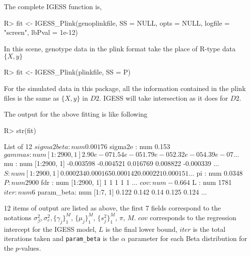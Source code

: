 \documentclass[11pt]{article}
\begin{document}
The complete IGESS function is,
\begin{Schunk}
\begin{Sinput}
R> fit <- IGESS_Plink(genoplinkfile, SS = NULL, opts = NULL, logfile = "screen",
                                                                   lbPval = 1e-12)
\end{Sinput}
\end{Schunk}

In this scene,  genotype data in the plink format take the place of R-type data $\{X, y\}$
\begin{Schunk}
\begin{Sinput}
R> fit <- IGESS_Plink(plinkfile, SS = P)
\end{Sinput}
\end{Schunk}
For the simulated data in this package, all the information contained in the plink files is the same as $\{X, y\}$ in $D2$. IGESS will take intersection as it does for $D2$.



The output for the above fitting is like following
\begin{Schunk}
\begin{Sinput}
R> str(fit)
\end{Sinput}
\begin{Soutput}
List of 12
 $ sigma2beta: num 0.00176
 $ sigma2e   : num 0.153
 $ gammas    : num [1:2900, 1] 2.90e-07 1.54e-05 1.79e-05 2.32e-05 4.39e-07 ...
 $ mu        : num [1:2900, 1] -0.003598 -0.004521 0.016769 0.008822 -0.000339 ...
 $ S         : num [1:2900, 1] 0.000234 0.000165 0.000142 0.000221 0.000151 ...
 $ pi        : num 0.0348
 $ P         : num 2900
 $ fdr       : num [1:2900, 1] 1 1 1 1 1 ...
 $ cov       : num -0.664
 $ L         : num 1781
 $ iter      : num 6
 $ param_beta: num [1:7, 1] 0.122 0.142 0.14 0.125 0.124 ...
\end{Soutput}
\end{Schunk}
12 items of output are listed as above, the first 7 fields correspond to the notations $\sigma^2_{\beta},\sigma^2_e, \{\gamma_j\}_1^{M}$, $\{\mu_j\}_1^M$, $\{s^2_j\}_1^M$, $\pi$, $M$. $cov$ corresponds to the regression intercept for the IGESS model, $L$ is the final lower bound, $iter$ is the total iterations taken and \texttt{param\_beta} is the $\alpha$ parameter for each Beta distribution for the $p$-values.


\end{document}
